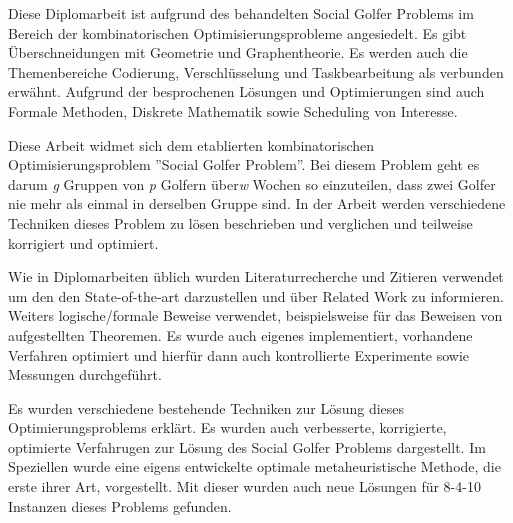 
Diese Diplomarbeit ist aufgrund des behandelten Social Golfer Problems im Bereich der kombinatorischen Optimisierungsprobleme angesiedelt. Es gibt Überschneidungen mit Geometrie und Graphentheorie. Es werden auch die Themenbereiche Codierung, Verschlüsselung und Taskbearbeitung als verbunden erwähnt. Aufgrund der besprochenen Lösungen und Optimierungen sind auch Formale Methoden, Diskrete Mathematik sowie Scheduling von Interesse.

Diese Arbeit widmet sich dem etablierten kombinatorischen Optimisierungsproblem ''Social Golfer Problem''. Bei diesem Problem geht es darum \emph{g} Gruppen von \emph{p} Golfern über\emph{w} Wochen so einzuteilen, dass zwei Golfer nie mehr als einmal in derselben Gruppe sind. In der Arbeit werden verschiedene Techniken dieses Problem zu lösen beschrieben und verglichen und teilweise korrigiert und optimiert.

Wie in Diplomarbeiten üblich wurden Literaturrecherche und Zitieren verwendet um den den State-of-the-art darzustellen und über Related Work zu informieren. Weiters logische/formale Beweise verwendet, beispielsweise für das Beweisen von aufgestellten Theoremen. Es wurde auch eigenes implementiert, vorhandene Verfahren optimiert und hierfür dann auch kontrollierte Experimente sowie Messungen durchgeführt.

Es wurden verschiedene bestehende Techniken zur Lösung dieses Optimierungsproblems erklärt. Es wurden auch verbesserte, korrigierte, optimierte Verfahrugen zur Lösung des Social Golfer Problems dargestellt. Im Speziellen wurde eine eigens entwickelte optimale metaheuristische Methode, die erste ihrer Art, vorgestellt. Mit dieser wurden auch neue Lösungen für 8-4-10 Instanzen dieses Problems gefunden.

